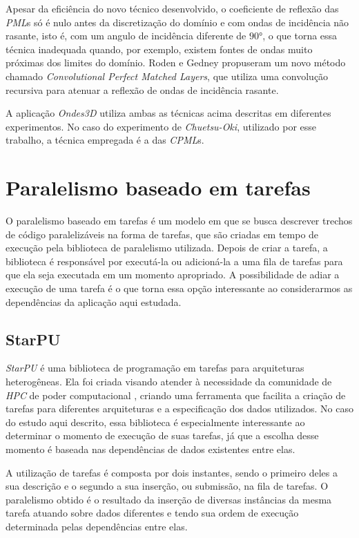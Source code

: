 \documentclass[cic,tc]{iiufrgs}
\begin{document}
Apesar da eficiência do novo técnico desenvolvido, o coeficiente de reflexão das \textit{PML}s só é nulo antes da discretização do domínio e com ondas de incidência não rasante,
isto é, com um angulo de incidência diferente de $90$°, o que torna essa técnica inadequada quando, por exemplo, existem fontes de ondas muito próximas dos limites do domínio. Roden e
Gedney \cite{CPML} propuseram um novo método chamado \textit{Convolutional Perfect Matched Layers}, que utiliza uma convolução recursiva para atenuar a reflexão de ondas de incidência rasante.

A aplicação \textit{Ondes3D} utiliza ambas as técnicas acima descritas em diferentes experimentos. No caso do experimento de \textit{Chuetsu-Oki}, utilizado por esse trabalho, a técnica
empregada é a das \textit{CPML}s.


\section{Paralelismo baseado em tarefas}

O paralelismo baseado em tarefas é um modelo em que se busca descrever trechos de código paralelizáveis na forma de tarefas, que são criadas em tempo de execução pela biblioteca de
paralelismo utilizada. Depois de criar a tarefa, a biblioteca é responsável por executá-la ou adicioná-la a uma fila de tarefas para que ela seja executada em um momento apropriado.
A possibilidade de adiar a execução de uma tarefa é o que torna essa opção interessante ao considerarmos as dependências da aplicação aqui estudada.

\subsection{StarPU}

\textit{StarPU} é uma biblioteca de programação em tarefas para arquiteturas heterogêneas. Ela foi criada visando atender à necessidade da comunidade de \textit{HPC} de
poder computacional \cite{StarPU}, criando uma ferramenta que facilita a criação de tarefas para diferentes arquiteturas e a especificação dos dados utilizados. No caso do estudo aqui
descrito, essa biblioteca é especialmente interessante ao determinar o momento de execução de suas tarefas, já que a escolha desse momento é baseada nas dependências de dados
existentes entre elas.

A utilização de tarefas é composta por dois instantes, sendo o primeiro deles a sua descrição e o segundo a sua inserção, ou submissão, na fila de tarefas. O paralelismo obtido
é o resultado da inserção de diversas instâncias da mesma tarefa atuando sobre dados diferentes e tendo sua ordem de execução determinada pelas dependências entre elas.
\end{document}
